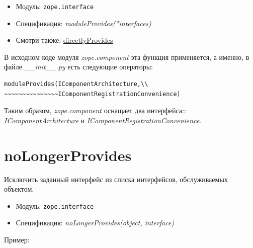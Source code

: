 \documentclass[a4paper,openany,twoside,draft]{book}
\providecommand*{\DUroletitlereference}[1]{\textsl{#1}}
\begin{document}
\begin{itemize}

\item Модуль: \texttt{zope.interface}

\item Спецификация: \DUroletitlereference{moduleProvides(*interfaces)}

\item Смотри также: \hyperref[directlyprovides]{directlyProvides}

\end{itemize}

В исходном коде модуля \DUroletitlereference{zope.component} эта функция применяется, а
именно, в файле \DUroletitlereference{\_\_init\_\_.py} есть следующие операторы:

\begin{verbatim}
moduleProvides(IComponentArchitecture,\\
~~~~~~~~~~~~~~~IComponentRegistrationConvenience)
\end{verbatim}

Таким образом, \DUroletitlereference{zope.component} оснащает два интерфейса::
\DUroletitlereference{IComponentArchitecture} и \DUroletitlereference{IComponentRegistrationConvenience}.


\section*{noLongerProvides%
  \label{nolongerprovides}%
}

Исключить заданный интерфейс из списка интерфейсов, обслуживаемых
объектом.

\begin{itemize}

\item Модуль: \texttt{zope.interface}

\item Спецификация: \DUroletitlereference{noLongerProvides(object, interface)}

\end{itemize}

Пример:
\end{document}
